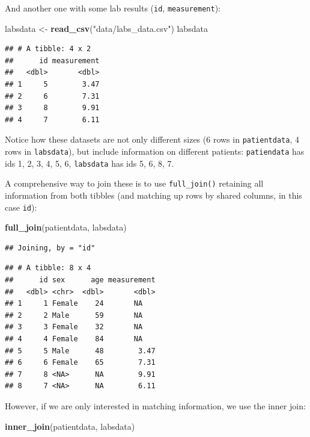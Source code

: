 \documentclass[
  12pt,
  krantz2]{krantz}
\makeatletter
\newenvironment{Shaded}{\begin{snugshade}}{\end{snugshade}}
\newcommand{\KeywordTok}[1]{\textcolor[rgb]{0.13,0.29,0.53}{\textbf{#1}}}
\newcommand{\NormalTok}[1]{#1}
\newcommand{\StringTok}[1]{\textcolor[rgb]{0.31,0.60,0.02}{#1}}
\newenvironment{kframe}{%
\medskip{}
\setlength{\fboxsep}{.8em}
 \def\at@end@of@kframe{}%
 \ifinner\ifhmode%
  \def\at@end@of@kframe{\end{minipage}}%
  \begin{minipage}{\columnwidth}%
 \fi\fi%
 \def\FrameCommand##1{\hskip\@totalleftmargin \hskip-\fboxsep
 \colorbox{shadecolor}{##1}\hskip-\fboxsep
     \hskip-\linewidth \hskip-\@totalleftmargin \hskip\columnwidth}%
 \MakeFramed {\advance\hsize-\width
   \@totalleftmargin\z@ \linewidth\hsize
   \@setminipage}}%
 {\par\unskip\endMakeFramed%
 \at@end@of@kframe}
\renewenvironment{Shaded}{\begin{kframe}}{\end{kframe}}
\makeatother
\begin{document}
And another one with some lab results (\texttt{id}, \texttt{measurement}):

\begin{Shaded}
\begin{Highlighting}[]
\NormalTok{labsdata <-}\StringTok{ }\KeywordTok{read_csv}\NormalTok{(}\StringTok{"data/labs_data.csv"}\NormalTok{)}
\NormalTok{labsdata}
\end{Highlighting}
\end{Shaded}

\begin{verbatim}
## # A tibble: 4 x 2
##      id measurement
##   <dbl>       <dbl>
## 1     5        3.47
## 2     6        7.31
## 3     8        9.91
## 4     7        6.11
\end{verbatim}

Notice how these datasets are not only different sizes (6 rows in \texttt{patientdata}, 4 rows in \texttt{labsdata}), but include information on different patients: \texttt{patiendata} has ids 1, 2, 3, 4, 5, 6, \texttt{labsdata} has ids 5, 6, 8, 7.

A comprehensive way to join these is to use \texttt{full\_join()} retaining all information from both tibbles (and matching up rows by shared columns, in this case \texttt{id}):

\begin{Shaded}
\begin{Highlighting}[]
\KeywordTok{full_join}\NormalTok{(patientdata, labsdata)}
\end{Highlighting}
\end{Shaded}

\begin{verbatim}
## Joining, by = "id"
\end{verbatim}

\begin{verbatim}
## # A tibble: 8 x 4
##      id sex      age measurement
##   <dbl> <chr>  <dbl>       <dbl>
## 1     1 Female    24       NA   
## 2     2 Male      59       NA   
## 3     3 Female    32       NA   
## 4     4 Female    84       NA   
## 5     5 Male      48        3.47
## 6     6 Female    65        7.31
## 7     8 <NA>      NA        9.91
## 8     7 <NA>      NA        6.11
\end{verbatim}

However, if we are only interested in matching information, we use the inner join:

\begin{Shaded}
\begin{Highlighting}[]
\KeywordTok{inner_join}\NormalTok{(patientdata, labsdata)}
\end{Highlighting}
\end{Shaded}
\end{document}
